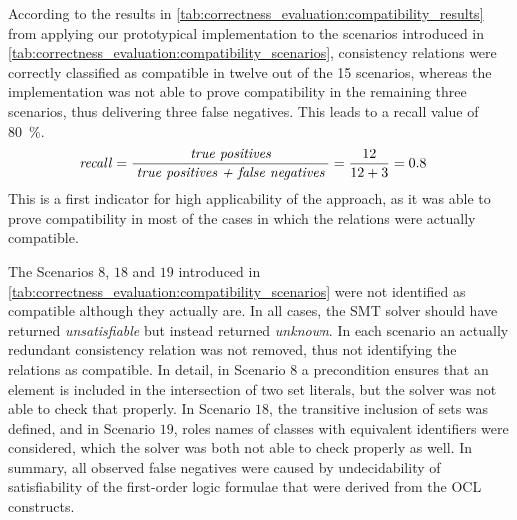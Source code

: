 According to the results in \autoref{tab:correctness_evaluation:compatibility_results} from applying our prototypical implementation to the scenarios introduced in \autoref{tab:correctness_evaluation:compatibility_scenarios}, consistency relations were correctly classified as compatible in twelve out of the 15 scenarios, whereas the implementation was not able to prove compatibility in the remaining three scenarios, thus delivering three false negatives.
This leads to a recall value of \SI{80}{\percent}.
\begin{align*}
    &
    \mathit{recall} = \frac{\; \textit{true positives} \;}{\; \textit{true positives + false negatives} \;} = \frac{12}{12+3} = 0.8
\end{align*}
%
%
This is a first indicator for high applicability of the approach, as it was able to prove compatibility in most of the cases in which the relations were actually compatible.

The Scenarios $8$, $18$ and $19$ introduced in \autoref{tab:correctness_evaluation:compatibility_scenarios} were not identified as compatible although they actually are.
In all cases, the \gls{SMT} solver should have returned \emph{unsatisfiable} but instead returned \emph{unknown}.
In each scenario an actually redundant consistency relation was not removed, thus not identifying the relations as compatible.
In detail, in Scenario $8$ a precondition ensures that an element is included in the intersection of two set literals, but the solver was not able to check that properly.
In Scenario $18$, the transitive inclusion of sets was defined, and in Scenario $19$, roles names of classes with equivalent identifiers were considered, which the solver was both not able to check properly as well.
In summary, all observed false negatives were caused by undecidability of satisfiability of the first-order logic formulae that were derived from the \gls{OCL} constructs.

